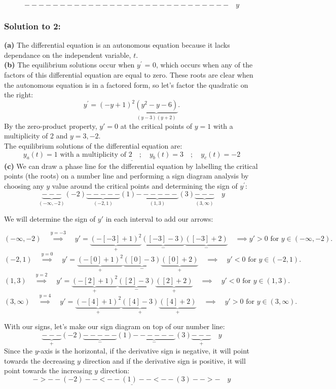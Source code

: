 \documentclass[a4paper,12pt]{article} %
\begin{document}
$$ ----------------------------- \quad y $$
\pagebreak

\subsubsection*{Solution to 2:}
\textbf{(a)} The differential equation is an autonomous equation because it lacks dependance on the independent variable, $t$.\\

\textbf{(b)} The equilibrium solutions occur when $y^{\prime}$ = 0, which occurs when any of the factors of this differential equation are equal to zero. These roots are clear when the autonomous equation is in a factored form, so let's factor the quadratic on the right:
$$ y^{\prime} = (-y+1)^2\underbrace{(y^2-y-6)}_{(y - 3)(y + 2)}. $$
By the zero-product property, $y' = 0$ at the critical points of $y = 1$ with a multiplicity of 2 and $y=3, -2$.\\

The equilibrium solutions of the differential equation are:
$$ \underline{\boxed{y_a(t) = 1 \text{ with a multiplicity of 2} \quad;\quad y_b(t) = 3 \quad;\quad y_c(t) = -2}}$$
\textbf{(c)} We can draw a phase line for the differential equation by labelling the critical points (the roots) on a number line and performing a sign diagram analysis by choosing any $y$ value around the critical points and determining the sign of $y^{\prime}$:\\
$$\underbrace{---}_{(-\infty, -2)}(-2)\underbrace{-----}_{(-2, 1)}(1)\underbrace{------}_{(1,3)}(3)\underbrace{---}_{(3, \infty)}\quad y $$

We will determine the sign of $y'$ in each interval to add our arrows:

$$ (-\infty, -2)\quad\overset{y=-3}\implies\quad y' = \underbrace{(-[-3] + 1)^2}_{+}\underbrace{([-3]-3)}_{-}\underbrace{([-3]+2)}_{-} \quad\implies y' > 0 \text{ for }y\in(-\infty, -2). $$
$$ (-2, 1) \quad\overset{y=0}\implies\quad y' = \underbrace{(-[0]+1)^2}_{+}\underbrace{([0]-3)}_{-}\underbrace{([0]+2)}_{+} \quad\implies\quad y'<0 \text{ for } y\in (-2,1). $$
$$ (1,3) \quad\overset{y=2}\implies\quad y' = \underbrace{(-[2]+1)^2}_{+}\underbrace{([2]-3)}_{-}\underbrace{([2]+2)}_{+} \quad\implies\quad y'<0 \text{ for } y \in (1,3).  $$
$$ (3,\infty) \quad\overset{y=4}\implies\quad y' = \underbrace{(-[4]+1)^2}_{+}\underbrace{([4]-3)}_{+}\underbrace{([4]+2)}_{+} \quad\implies\quad y'>0 \text{ for }y \in (3,\infty). $$

With our signs, let's make our sign diagram on top of our number line:
$$ \underbrace{---}_{+}(-2)\underbrace{-----}_{-}(1)\underbrace{------}_{-}(3)\underbrace{---}_{+}\quad y $$
Since the $y$-axis is the horizontal, if the derivative sign is negative, it will point towards the decreasing $y$ direction and if the derivative sign is positive, it will point towards the increasing $y$ direction:
$$\underline{\boxed{ ->--(-2)--<--(1)--<--(3)-->- \quad y}}$$
\pagebreak
\end{document}
